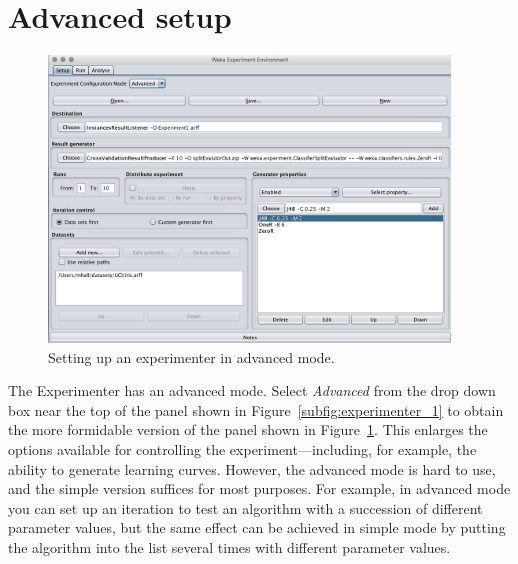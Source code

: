 \section{Advanced setup}

\begin{figure}[!th]
\centering
\includegraphics[width=0.95\textwidth]{images/B4_3.png}
\caption{Setting up an experimenter in advanced mode.}
\label{fig:experimenter_advanced}
\end{figure}


The Experimenter has an advanced mode. Select \textit{Advanced} from
the drop down box near the top of the panel shown in
Figure~\ref{subfig:experimenter_1} to obtain the more formidable
version of the panel shown in
Figure~\ref{fig:experimenter_advanced}. This enlarges the options
available for controlling the experiment---including, for example, the
ability to generate learning curves. However, the advanced mode is
hard to use, and the simple version suffices for most purposes. For
example, in advanced mode you can set up an iteration to test an
algorithm with a succession of different parameter values, but the
same effect can be achieved in simple mode by putting the algorithm
into the list several times with different parameter values.

